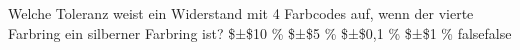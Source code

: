     {Welche Toleranz weist ein Widerstand mit 4 Farbcodes auf, wenn der vierte Farbring ein silberner Farbring ist?}
    { \$±\$10 \%}
    { \$±\$5 \%}
    { \$±\$0,1 \%}
    { \$±\$1 \%}
    {false}{false}